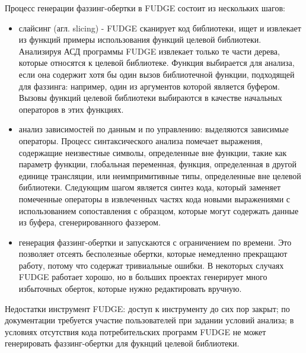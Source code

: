 Процесс генерации фаззинг-обертки в FUDGE состоит из нескольких шагов:
\begin{itemize}
    \item слайсинг (агл. slicing) - FUDGE сканирует код библиотеки, ищет и извлекает из функций примеры использования функций целевой библиотеки. Анализируя АСД программы FUDGE извлекает только те части дерева, которые относятся к целевой библиотеке. Функция выбирается для анализа, если она содержит хотя бы один вызов библиотечной функции, подходящей для фаззинга: например, один из аргументов которой является буфером. Вызовы функций целевой библиотеки выбираются в качестве начальных операторов в этих функциях.
    \item анализ зависимостей по данным и по управлению: выделяются зависимые операторы. Процесс синтаксического анализа помечает выражения, содержащие неизвестные символы, определенные вне функции, такие как параметр функции, глобальная переменная, функция, определенная в другой единице трансляции, или неимпримитивные типы, определенные вне целевой библиотеки. Следующим шагом является синтез кода, который заменяет помеченные операторы в извлеченных частях кода новыми выражениями с использованием сопоставления с образцом, которые могут содержать данные из буфера, сгенерированного фаззером.
    \item генерация фаззинг-обертки и запускаются с ограничением по времени. Это позволяет отсеять бесполезные обертки, которые немедленно прекращают работу, потому что содержат тривиальные ошибки. В некоторых случаях FUDGE работает хорошо, но в больших проектах генерирует много избыточных оберток, которые нужно редактировать вручную.
\end{itemize}
Недостатки инструмент FUDGE: доступ к инструменту  до сих пор  закрыт; по документации требуется участие пользователей при задании условий анализа; в условиях отсутствия кода потребительских программ FUDGE не может генерировать фаззинг-обертки для фукнций целевой библиотеки. 

